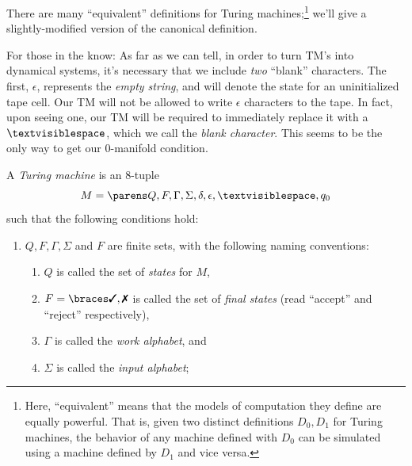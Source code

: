 \documentclass{fkpaper}
\newcommand{\blank}{\textvisiblespace}
\begin{document}
\begin{multicols}{2}
  There are many ``equivalent'' definitions for Turing
  machines;\footnote{Here, ``equivalent'' means that the models of
    computation they define are equally powerful. That is, given two
    distinct definitions $D_0, D_1$ for Turing machines, the behavior of
    any machine defined with $D_0$ can be simulated using a machine
    defined by $D_1$ and vice versa.} we'll give a slightly-modified
  version of the canonical definition.
  \begin{remark}
    For those in the know: As far as we can tell, in order to turn TM's
    into dynamical systems, it's necessary that we include \emph{two}
    ``blank'' characters. The first, $\epsilon$, represents the
    \emph{empty string}, and will denote the state for an uninitialized
    tape cell. Our TM will not be allowed to write $\epsilon$ characters
    to the tape. In fact, upon seeing one, our TM will be required to
    immediately replace it with a $\blank$, which we call the
    \emph{blank character}. This seems to be the only way to get our
    $0$-manifold condition.
  \end{remark}
  \begin{definition}
    A \emph{Turing machine} is an 8-tuple
    \[
      M = \pn{Q, F, \Gamma, \Sigma, \delta, \epsilon, \blank, q_0}
    \]
    such that the following conditions hold:
    \begin{enumerate}[label=\arabic*)]
      \item $Q, F, \Gamma, \Sigma$ and $F$ are finite sets, with the
        following naming conventions:
        \begin{enumerate}[label=\roman*)]
          \item $Q$ is called the set of \emph{states} for $M$,
          \item $F = \set{\cmark, \xmark}$ is called the set of
            \emph{final states} (read ``accept'' and ``reject''
            respectively),
          \item $\Gamma$ is called the \emph{work alphabet}, and
          \item $\Sigma$ is called the \emph{input alphabet};

\end{enumerate}
\end{enumerate}
\end{definition}
\end{multicols}
\end{document}
